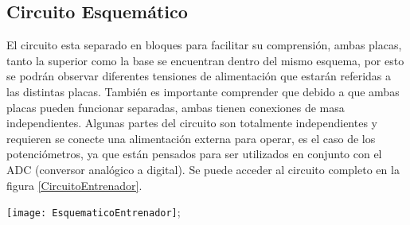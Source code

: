 \subsection{Circuito Esquemático}
El circuito esta separado en bloques para facilitar su comprensión, ambas placas, tanto la superior como la base se encuentran dentro del mismo esquema, por esto se podrán observar diferentes tensiones de alimentación que estarán referidas a las distintas placas. También es importante comprender que debido a que ambas placas pueden funcionar separadas, ambas tienen conexiones de masa independientes. Algunas partes del circuito son totalmente independientes y requieren se conecte una alimentación externa para operar, es el caso de los potenciómetros, ya que están pensados para ser utilizados en conjunto con el ADC (conversor analógico a digital). Se puede acceder al circuito completo en la figura \ref{CircuitoEntrenador}. %
\begin{sidewaysfigure}[htb]
	\centering\texttt{[image: EsquematicoEntrenador]};
	\caption{Circuito Esquemático Entrenador Digital}
	\label{CircuitoEntrenador}
\end{sidewaysfigure}%
